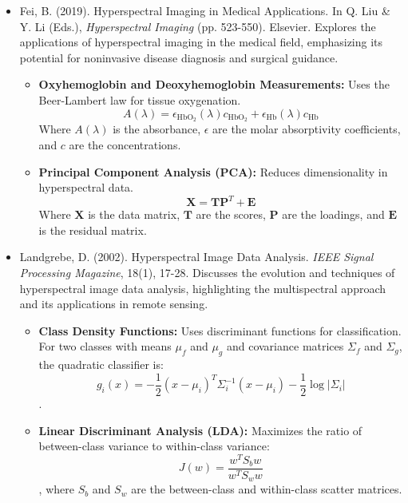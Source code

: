 \documentclass[10pt,svgnames,fragile]{beamer}
\begin{document}
\begin{frame}{}
\tiny
\begin{itemize}

    \item Fei, B. (2019). Hyperspectral Imaging in Medical Applications. In Q. Liu \& Y. Li (Eds.), \textit{Hyperspectral Imaging} (pp. 523-550). Elsevier. \href{https://doi.org/10.1016/B978-0-444-63977-6.00021-3}{\color{blue}{DOI: 10.1016/B978-0-444-63977-6.00021-3}}
    {\color{gray}Explores the applications of hyperspectral imaging in the medical field, emphasizing its potential for noninvasive disease diagnosis and surgical guidance.}
    \begin{itemize} \tiny
    \item \textbf{Oxyhemoglobin and Deoxyhemoglobin Measurements:} Uses the Beer-Lambert law for tissue oxygenation.
    \[
    A(\lambda) = \epsilon_{\text{HbO}_2}(\lambda) c_{\text{HbO}_2} + \epsilon_{\text{Hb}}(\lambda) c_{\text{Hb}}
    \]
    Where \( A(\lambda) \) is the absorbance, \( \epsilon \) are the molar absorptivity coefficients, and \( c \) are the concentrations.
    \item \textbf{Principal Component Analysis (PCA):} Reduces dimensionality in hyperspectral data.
    \[
    \mathbf{X} = \mathbf{TP}^T + \mathbf{E}
    \]
    Where \( \mathbf{X} \) is the data matrix, \( \mathbf{T} \) are the scores, \( \mathbf{P} \) are the loadings, and \( \mathbf{E} \) is the residual matrix.
\end{itemize}

\end{itemize}
\end{frame}
\begin{frame}{}
\tiny
\begin{itemize}

    \item Landgrebe, D. (2002). Hyperspectral Image Data Analysis. \textit{IEEE Signal Processing Magazine}, 18(1), 17-28. \href{https://ieeexplore.ieee.org/document/1352410}{\color{blue}{DOI: 10.1109/79.939829}}
    {\color{gray}Discusses the evolution and techniques of hyperspectral image data analysis, highlighting the multispectral approach and its applications in remote sensing.}
    \begin{itemize} \tiny
    \item \textbf{Class Density Functions:} Uses discriminant functions for classification. For two classes with means \( \mu_f \) and \( \mu_g \) and covariance matrices \( \Sigma_f \) and \( \Sigma_g \), the quadratic classifier is: \[ g_i(x) = -\frac{1}{2} (x - \mu_i)^T \Sigma_i^{-1} (x - \mu_i) - \frac{1}{2} \log |\Sigma_i| \].
    \item \textbf{Linear Discriminant Analysis (LDA):} Maximizes the ratio of between-class variance to within-class variance: \[ J(w) = \frac{w^T S_b w}{w^T S_w w} \], where \( S_b \) and \( S_w \) are the between-class and within-class scatter matrices.
\end{itemize}

\end{itemize}
\end{frame}
\end{document}
